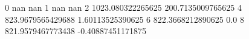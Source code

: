 0 nan nan
1 nan nan
2 1023.080322265625 200.7135009765625
4 823.9679565429688 1.60113525390625
6 822.3668212890625 0.0
8 821.9579467773438 -0.40887451171875
